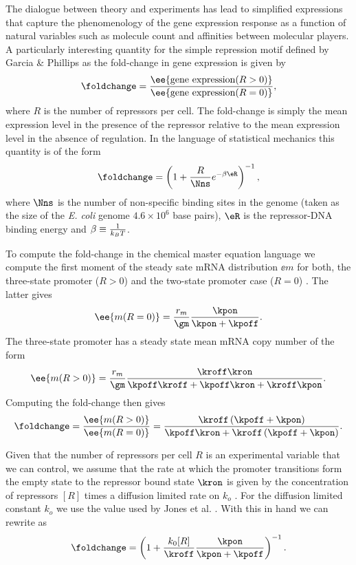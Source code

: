 The dialogue between theory and experiments has lead to simplified expressions
that capture the phenomenology of the gene expression response as a function of
natural variables such as molecule count and affinities between molecular
players. A particularly interesting quantity for the simple repression motif
defined by Garcia \& Phillips \cite{Garcia2011c} as the fold-change in gene
expression is given by
\begin{equation}
  \foldchange = {\ee{\text{gene expression}(R > 0)} \over
                 \ee{\text{gene expression}(R = 0)}},
\end{equation}
where $R$ is the number of repressors per cell. The fold-change is simply the
mean expression level in the presence of the repressor relative to the mean
expression level in the absence of regulation. In the language of statistical
mechanics this quantity is of the form \cite{Garcia2011c}
\begin{equation}
  \foldchange = \left( 1 + {R \over \Nns} e^{-\beta\eR} \right)^{-1},
  \label{seq_fc_thermo}
\end{equation}
where $\Nns$ is the number of non-specific binding sites in the genome (taken as
the size of the \textit{E. coli} genome $4.6\times 10^6$ base pairs), $\eR$ is
the repressor-DNA binding energy and $\beta \equiv {1 \over k_BT}$.

To compute the fold-change in the chemical master equation language we compute
the first moment of the steady sate mRNA distribution $\ee{m}$ for both, the
three-state promoter ($R>0$) and the two-state promoter case ($R=0$)
. The latter gives
\begin{equation}
  \ee{m (R = 0)} = {r_m \over \gm} {\kpon \over \kpon + \kpoff}.
\end{equation}
The three-state promoter has a steady state mean mRNA copy number of the form
\begin{equation}
  \ee{m (R > 0)} = {r_m \over \gm} {\kroff\kron
  \over \kpoff\kroff + \kpoff\kron + \kroff\kpon}.
\end{equation}
Computing the fold-change then gives
\begin{equation}
  \foldchange = {\ee{m (R > 0)} \over \ee{m (R = 0)}} =
  {\kroff \left( \kpoff + \kpon \right) \over
  \kpoff\kron + \kroff \left( \kpoff + \kpon \right)}.
  \label{seq_fold_change_cme}
\end{equation}

Given that the number of repressors per cell $R$ is an experimental variable
that we can control, we assume that the rate at which the promoter transitions
form the empty state to the repressor bound state $\kron$ is given by the
concentration of repressors $[R]$ times a diffusion limited rate on $k_o$
\cite{Jones2014a}.  For the diffusion limited constant $k_o$ we use the value
used by Jones et al. \cite{Jones2014a} . With this in hand we can rewrite
 as
\begin{equation}
  \foldchange = \left( 1 + {k_0 [R] \over \kroff}
                {\kpon \over \kpon + \kpoff} \right)^{-1}.
  \label{seq_fc_kinetic}
\end{equation}

